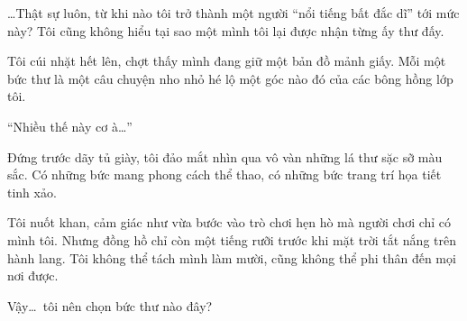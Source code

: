\documentclass[../main.tex]{subfiles}
\begin{document}
\dots Thật sự luôn, từ khi nào tôi trở thành một người ``nổi tiếng bất đắc dĩ'' tới mức này? Tôi cũng không hiểu tại sao một mình tôi lại được nhận từng ấy thư đấy.

Tôi cúi nhặt hết lên, chợt thấy mình đang giữ một bản đồ mảnh giấy. Mỗi một bức thư là một câu chuyện nho nhỏ hé lộ một góc nào đó của các bông hồng lớp tôi.

``Nhiều thế này cơ à\dots''

Đứng trước dãy tủ giày, tôi đảo mắt nhìn qua vô vàn những lá thư sặc sỡ màu sắc. Có những bức mang phong cách thể thao, có những bức trang trí họa tiết tinh xảo.

Tôi nuốt khan, cảm giác như vừa bước vào trò chơi hẹn hò mà người chơi chỉ có mình tôi. Nhưng đồng hồ chỉ còn một tiếng rưỡi trước khi mặt trời tắt nắng trên hành lang. Tôi không thể tách mình làm mười, cũng không thể phi thân đến mọi nơi được.

Vậy\dots\ tôi nên chọn bức thư nào đây?
\end{document}
